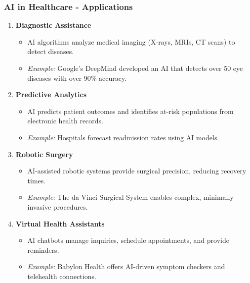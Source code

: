 \documentclass[aspectratio=169]{beamer}
\begin{document}
\begin{frame}[fragile]
    \frametitle{AI in Healthcare - Applications}
    \begin{enumerate}
        \item \textbf{Diagnostic Assistance}
            \begin{itemize}
                \item AI algorithms analyze medical imaging (X-rays, MRIs, CT scans) to detect diseases.
                \item \textit{Example:} Google's DeepMind developed an AI that detects over 50 eye diseases with over 90\% accuracy.
            \end{itemize}
        \item \textbf{Predictive Analytics}
            \begin{itemize}
                \item AI predicts patient outcomes and identifies at-risk populations from electronic health records.
                \item \textit{Example:} Hospitals forecast readmission rates using AI models.
            \end{itemize}
        \item \textbf{Robotic Surgery}
            \begin{itemize}
                \item AI-assisted robotic systems provide surgical precision, reducing recovery times.
                \item \textit{Example:} The da Vinci Surgical System enables complex, minimally invasive procedures.
            \end{itemize}
        \item \textbf{Virtual Health Assistants}
            \begin{itemize}
                \item AI chatbots manage inquiries, schedule appointments, and provide reminders.
                \item \textit{Example:} Babylon Health offers AI-driven symptom checkers and telehealth connections.
            \end{itemize}
    \end{enumerate}
\end{frame}
\end{document}
